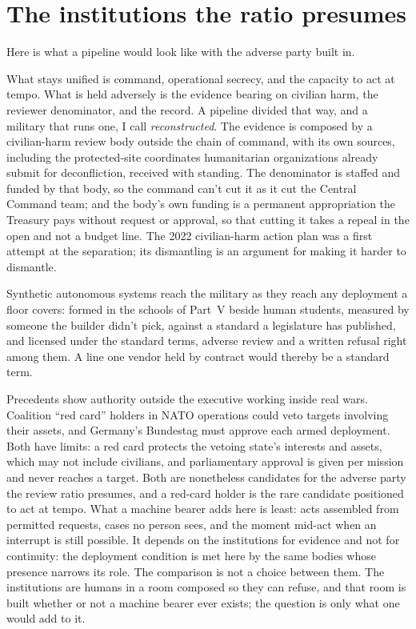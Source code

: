 \section{The institutions the ratio presumes}
\label{sec:7.2}
Here is what a pipeline would look like with the adverse party built in.

What stays unified is command, operational secrecy, and the capacity to act at tempo. What is held adversely is the evidence bearing on civilian harm, the reviewer denominator, and the record. A pipeline divided that way, and a military that runs one, I call \emph{reconstructed}. The evidence is composed by a civilian-harm review body outside the chain of command, with its own sources, including the protected-site coordinates humanitarian organizations already submit for deconfliction, received with standing. The denominator is staffed and funded by that body, so the command can't cut it as it cut the Central Command team; and the body's own funding is a permanent appropriation the Treasury pays without request or approval, so that cutting it takes a repeal in the open and not a budget line. The 2022 civilian-harm action plan was a first attempt at the separation; its dismantling is an argument for making it harder to dismantle.

Synthetic autonomous systems reach the military as they reach any deployment a floor covers: formed in the schools of Part~V beside human students, measured by someone the builder didn't pick, against a standard a legislature has published, and licensed under the standard terms, adverse review and a written refusal right among them. A line one vendor held by contract would thereby be a standard term.

Precedents show authority outside the executive working inside real wars. Coalition “red card” holders in NATO operations could veto targets involving their assets, and Germany's Bundestag must approve each armed deployment. Both have limits: a red card protects the vetoing state's interests and assets, which may not include civilians, and parliamentary approval is given per mission and never reaches a target. Both are nonetheless candidates for the adverse party the review ratio presumes, and a red-card holder is the rare candidate positioned to act at tempo. What a machine bearer adds here is least: acts assembled from permitted requests, cases no person sees, and the moment mid-act when an interrupt is still possible. It depends on the institutions for evidence and not for continuity: the deployment condition is met here by the same bodies whose presence narrows its role. The comparison is not a choice between them. The institutions are humans in a room composed so they can refuse, and that room is built whether or not a machine bearer ever exists; the question is only what one would add to it.

